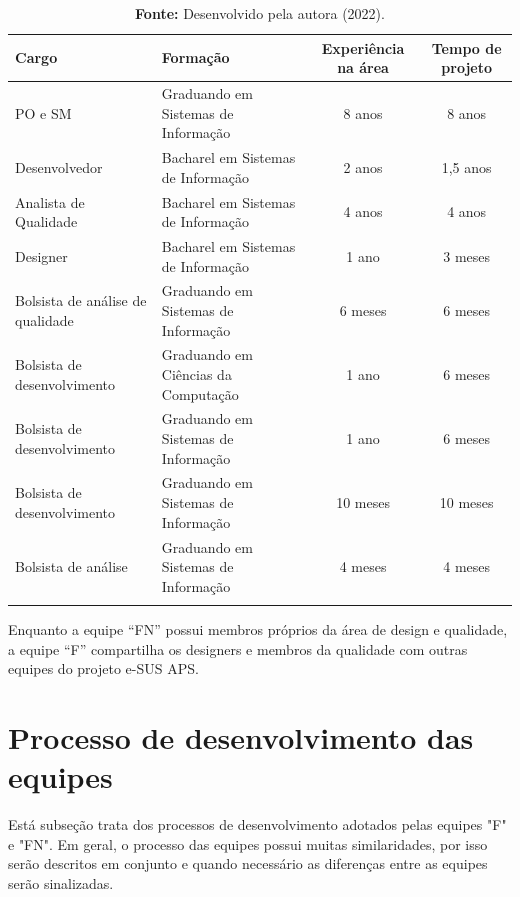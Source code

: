 \documentclass[
    12pt,       %
    openright,      %
    twoside,      %
    a4paper,      %
    english,      %
    french,       %
    spanish,      %
    brazil,       %
    ]{abntex2}
\begin{document}
\begin{longtable}{|p{4cm}|p{4cm}|c|c|}
    \caption{Membros da equipe FN}
    \label{tab:EquipeC}
    \centering
            \centering
            \hline \rowcolor{lightgray}
            \textbf{Cargo} & \textbf{Formação} & \textbf{Experiência na área} & \textbf{Tempo de projeto} 
            \\ \hline 
            PO e SM & Graduando em Sistemas de Informação & 8 anos & 8 anos 
            \\ \hline
            Desenvolvedor & Bacharel em Sistemas de Informação & 2 anos & 1,5 anos 
            \\ \hline 
            Analista de Qualidade & Bacharel em Sistemas de Informação & 4 anos & 4 anos 
            \\ \hline 
            Designer & Bacharel em Sistemas de Informação & 1 ano & 3 meses 
            \\ \hline
            Bolsista de análise de qualidade & Graduando em Sistemas de Informação & 6 meses & 6 meses 
            \\ \hline 
            Bolsista de desenvolvimento & Graduando em Ciências da Computação & 1 ano & 6 meses 
            \\ \hline 
            Bolsista de desenvolvimento & Graduando em Sistemas de Informação & 1 ano & 6 meses 
            \\ \hline             
            Bolsista de desenvolvimento & Graduando em Sistemas de Informação & 10 meses & 10 meses 
            \\ \hline             
            Bolsista de análise & Graduando em Sistemas de Informação & 4 meses & 4 meses 
            \\ \hline 
            \addlinespace[0.2cm]
            \caption*{\textbf{Fonte:} Desenvolvido pela autora (2022).}
\end{longtable}

Enquanto a equipe ``FN'' possui membros próprios da área de design e qualidade, a equipe ``F'' compartilha os designers e membros da qualidade com outras equipes do projeto e-SUS APS. 

\section{Processo de desenvolvimento das equipes}

Está subseção trata dos processos de desenvolvimento adotados pelas equipes "F" e "FN". Em geral, o processo das equipes possui muitas similaridades, por isso serão descritos em conjunto e quando necessário as diferenças entre as equipes serão sinalizadas.
\end{document}
